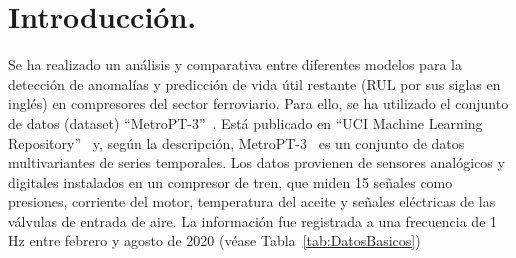 \documentclass[12pt,letterpaper]{article}
\begin{document}
\hypertarget{Indice}{}
\tableofcontents
\newpage
\section{Introducción.}
Se ha realizado un análisis y comparativa entre diferentes modelos para la detección de anomalías y predicción de vida útil restante (RUL por sus siglas en inglés)
en compresores del sector ferroviario. Para ello, se ha utilizado el conjunto de datos (dataset) ``MetroPT-3''~\cite{MetroPT-3}.
Está publicado en ``UCI Machine Learning Repository''~\cite{UCIMLR} y, según la descripción, MetroPT-3~\cite{MetroPT-3} es un conjunto de datos multivariantes de series temporales. Los datos provienen de sensores analógicos y digitales 
instalados en un compresor de tren, que miden 15 señales como presiones, corriente del motor, temperatura del aceite y señales eléctricas de las válvulas de entrada de aire. 
La información fue registrada a una frecuencia de 1 Hz entre febrero y agosto de 2020 (véase Tabla~\ref{tab:DatosBasicos})
\end{document}
